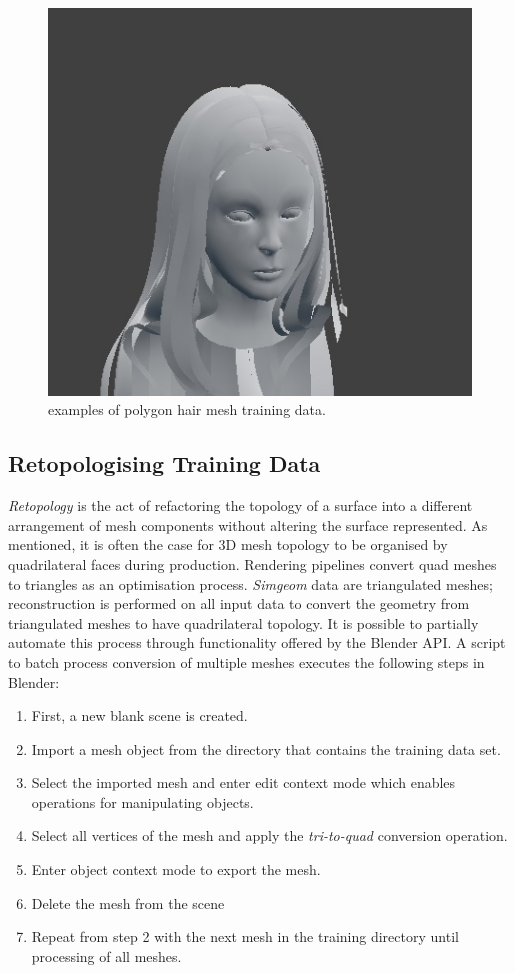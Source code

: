 \documentclass[ %
author={Dillon Keith Diep},
supervisor={Dr. Carl Henrik Ek},
degree={MEng},
title={ART-CG Hair:},
subtitle={Assisted Real-time Content Generation of Stylised Virtual Hair},
type={Research},
year={2017} ]{dissertation}
\begin{document}
\begin{figure}[!h]
	\includegraphics[scale=2]{images/inputHair4}
	\caption{examples of polygon hair mesh training data.}
	\label{inputHairs}
\end{figure}

\subsection{Retopologising Training Data}
\textit{Retopology} is the act of refactoring the topology of a surface into a different arrangement of mesh components without altering the surface represented. As mentioned, it is often the case for 3D mesh topology to be organised by quadrilateral faces during production. Rendering pipelines convert quad meshes to triangles as an optimisation process. \textit{Simgeom} data are triangulated meshes; reconstruction is performed on all input data to convert the geometry from triangulated meshes to have quadrilateral topology. It is possible to partially automate this process through functionality offered by the Blender API. A script to batch process conversion of multiple meshes executes the following steps in Blender:
\begin{enumerate}
	\item First, a new blank scene is created.
	\item Import a mesh object from the directory that contains the training data set.
	\item Select the imported mesh and enter edit context mode which enables operations for manipulating objects.
	\item Select all vertices of the mesh and apply the \textit{tri-to-quad} conversion operation.
	\item Enter object context mode to export the mesh.
	\item Delete the mesh from the scene
	\item Repeat from step 2 with the next mesh in the training directory until processing of all meshes.
\end{enumerate}
\end{document}

